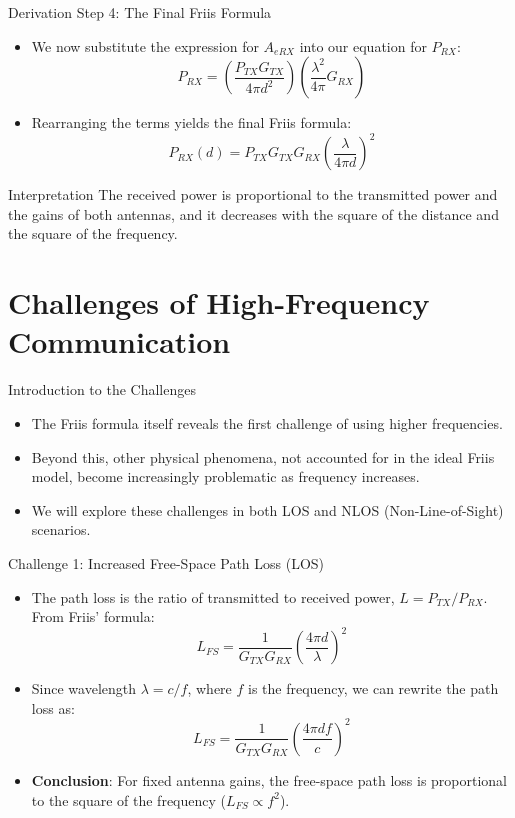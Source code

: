 \documentclass{beamer}
\begin{document}
	\begin{frame}{Derivation Step 4: The Final Friis Formula}
		\begin{itemize}
			\item We now substitute the expression for $A_{eRX}$ into our equation for $P_{RX}$:
			\[ P_{RX} = \left( \frac{P_{TX} G_{TX}}{4\pi d^2} \right) \left( \frac{\lambda^2}{4\pi} G_{RX} \right) \]
			\item Rearranging the terms yields the final Friis formula:
			\[ \boxed{P_{RX}(d) = P_{TX} G_{TX} G_{RX} \left( \frac{\lambda}{4\pi d} \right)^2} \]
		\end{itemize}
		\begin{block}{Interpretation}
			The received power is proportional to the transmitted power and the gains of both antennas, and it decreases with the square of the distance and the square of the frequency.
		\end{block}
	\end{frame}
	
	\section{Challenges of High-Frequency Communication}
	
	\begin{frame}{Introduction to the Challenges}
		\begin{itemize}
			\item The Friis formula itself reveals the first challenge of using higher frequencies.
			\item Beyond this, other physical phenomena, not accounted for in the ideal Friis model, become increasingly problematic as frequency increases.
			\item We will explore these challenges in both LOS and NLOS (Non-Line-of-Sight) scenarios.
		\end{itemize}
	\end{frame}
	
	\begin{frame}{Challenge 1: Increased Free-Space Path Loss (LOS)}
		\begin{itemize}
			\item The path loss is the ratio of transmitted to received power, $L = P_{TX}/P_{RX}$. From Friis' formula:
			\[ L_{FS} = \frac{1}{G_{TX}G_{RX}} \left( \frac{4\pi d}{\lambda} \right)^2 \]
			\item Since wavelength $\lambda = c/f$, where $f$ is the frequency, we can rewrite the path loss as:
			\[ L_{FS} = \frac{1}{G_{TX}G_{RX}} \left( \frac{4\pi d f}{c} \right)^2 \]
			\item \textbf{Conclusion}: For fixed antenna gains, the free-space path loss is proportional to the square of the frequency ($L_{FS} \propto f^2$).
		\end{itemize}
	\end{frame}
	
\end{document}
